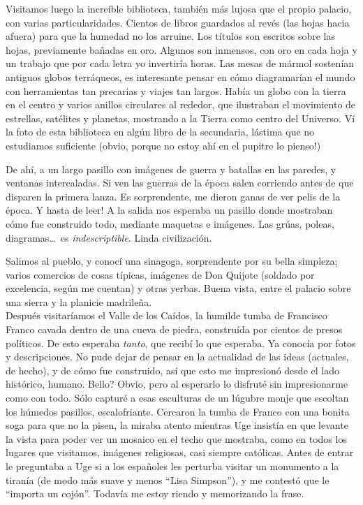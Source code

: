 Visitamos luego la incre\'ible biblioteca, tambi\'en m\'as lujosa que el
propio palacio, con varias particularidades. Cientos de libros guardados al
rev\'es (las hojas hacia afuera) para que la humedad no los arruine. Los
t\'itulos son escritos sobre las hojas, previamente ba\~nadas en oro. Algunos
son inmensos, con oro en cada hoja y un trabajo que por cada letra yo
invertir\'ia horas. Las mesas de m\'armol sosten\'ian antiguos globos
terr\'aqueos, es interesante pensar en c\'omo diagramar\'ian el mundo con
herramientas tan precarias y viajes tan largos. Hab\'ia un globo con la tierra
en el centro y varios anillos circulares al rededor, que ilustraban el
movimiento de estrellas, sat\'elites y planetas, mostrando a la Tierra como
centro del Universo. V\'i la foto de esta biblioteca en alg\'un libro de la
secundaria, l\'astima que no estudiamos suficiente (obvio, \textexclamdown
porque no estoy ah\'i en el pupitre lo pienso!)

De ah\'i, a un largo pasillo con im\'agenes de guerra y batallas en las
paredes, y ventanas intercaladas. Si ven las guerras de la \'epoca salen
corriendo antes de que disparen la primera lanza. Es sorprendente, me dieron
ganas de ver pelis de la \'epoca. \textexclamdown Y hasta de leer! A la salida
nos esperaba un pasillo donde mostraban c\'omo fue construido todo, mediante
maquetas e im\'agenes. Las gr\'uas, poleas, diagramas\ldots\ es
\emph{indescriptible}. Linda civilizaci\'on.

Salimos al pueblo, y conoc\'i una sinagoga, sorprendente por su bella
simpleza; varios comercios de cosas t\'ipicas, im\'agenes de Don Quijote
(soldado por excelencia, seg\'un me cuentan) y otras yerbas. Buena vista,
entre el palacio sobre una sierra y la planicie madrile\~na.\\

Despu\'es visitar\'iamos el Valle de los Ca\'idos, la humilde tumba de Francisco
Franco cavada dentro de una cueva de piedra, constru\'ida por cientos de presos
pol\'iticos. De esto esperaba \emph{tanto}, que recib\'i lo que esperaba. Ya
conoc\'ia por fotos y descripciones. No pude dejar de pensar en la actualidad de
las ideas (actuales, de hecho), y de c\'omo fue construido, as\'i que esto me
impresion\'o desde el lado hist\'orico, humano. \textquestiondown Bello? Obvio,
pero al esperarlo lo disfrut\'e sin impresionarme como con todo. S\'olo
captur\'e a esas esculturas de un l\'ugubre monje que escoltan los h\'umedos
pasillos, escalofriante. Cercaron la tumba de Franco con una bonita soga para
que no la pisen, la miraba atento mientras Uge insist\'ia en que levante la
vista para poder ver un mosaico en el techo que mostraba, como en todos los
lugares que visitamos, im\'agenes religiosas, casi siempre cat\'olicas. Antes de
entrar le preguntaba a Uge si a los espa\~noles les perturba visitar un
monumento a la tiran\'ia (de modo m\'as suave y menos ``Lisa Simpson''), y me
contest\'o que le ``importa un coj\'on''. Todav\'ia me estoy riendo y
memorizando la frase.

